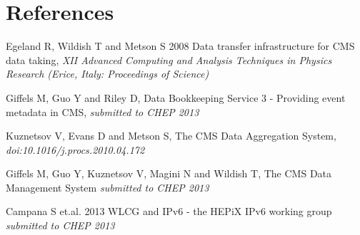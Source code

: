 \section*{References}

\begin{thebibliography}{1}
  Egeland R, Wildish T and Metson S 2008 Data transfer infrastructure for CMS data taking,  {\it XII Advanced Computing and Analysis Techniques in Physics Research (Erice, Italy: Proceedings of Science)}

Giffels M, Guo Y and Riley D, Data Bookkeeping Service 3 - Providing event metadata in CMS, {\it submitted to CHEP 2013}

Kuznetsov V, Evans D and Metson S, The CMS Data Aggregation System,
{\it doi:10.1016/j.procs.2010.04.172}

Giffels M, Guo Y, Kuznetsov V, Magini N and Wildish T, The CMS Data Management System {\it submitted to CHEP 2013}


Campana S et.al. 2013 WLCG and IPv6 - the HEPiX IPv6 working group {\it submitted to CHEP 2013}
 
\end{thebibliography}
